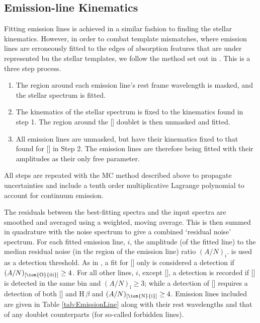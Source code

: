 	\subsection{Emission-line Kinematics}
		\label{subsec:EmissionFit}
		Fitting emission lines is achieved in a similar fashion to finding the stellar kinematics. However, in order to combat template mismatches, where emission lines are erroneously fitted to the edges of absorption features that are under represented bu the stellar templates, we follow the method set out in \citet{Sarzi2005}. This is a three step process.
		\begin{enumerate}
			\item The region around each emission line's rest frame wavelength is masked, and the stellar spectrum is fitted.
			\item The kinematics of the stellar spectrum is fixed to the kinematics found in step 1. The region around the [] doublet is then unmasked and fitted.  
			\item All emission lines are unmasked, but have their kinematics fixed to that found for [] in Step 2. The emission lines are therefore being fitted with their amplitudes as their only free parameter. 
		\end{enumerate}
		All steps are repeated with the MC method described above to propagate uncertainties and include a tenth order multiplicative Lagrange polynomial to account for continuum emission. 

		The residuals between the best-fitting spectra and the input spectra are smoothed and averaged using a weighted, moving average. This is then summed in quadrature with the noise spectrum to give a combined `residual noise' spectrum. For each fitted emission line, $i$, the amplitude (of the fitted line) to the median residual noise (in the region of the emission line) ratio $(A/N)_i$. is used as a detection threshold. As in \citet{Sarzi2005}, a fit for [] only is considered a detection if $(A/N)_{[\text{\ion{O}{iii}}]} \ge 4$. For all other lines, $i$, except [], a detection is recorded if [] is detected in the same bin and $(A/N)_\mathrm{i} \ge 3$; while a detection of [] requires a detection of both [] and H\,$\beta$ and $(A/N)_{[\text{\ion{N}{i}}]} \ge 4$. Emission lines included are given in Table \ref{tab:EmissionLine} along with their rest wavelengths and that of any doublet counterparts (for so-called forbidden lines). 

